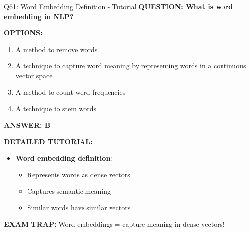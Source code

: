 \documentclass[8pt]{beamer}
\begin{document}
	\begin{frame}{Q61: Word Embedding Definition - Tutorial}
		\fontsize{6.5}{7.5}\selectfont
		\textbf{QUESTION: What is word embedding in NLP?}
		
		\vspace{0.1cm}
		\textbf{OPTIONS:}
		\begin{enumerate}
			\item A method to remove words
			\item A technique to capture word meaning by representing words in a continuous vector space
			\item A method to count word frequencies
			\item A technique to stem words
		\end{enumerate}
		
		\vspace{0.1cm}
		\textcolor{myblue}{\textbf{ANSWER: B}}
		
		\vspace{0.1cm}
		\textbf{DETAILED TUTORIAL:}
		\begin{itemize}
			\item \textbf{Word embedding definition:}
			\begin{itemize}
				\item Represents words as dense vectors
				\item Captures semantic meaning
				\item Similar words have similar vectors
			\end{itemize}
		\end{itemize}
		
		\textcolor{myred}{\textbf{EXAM TRAP:}} Word embeddings = \textcolor{myblue}{capture meaning in dense vectors}!
	\end{frame}
	
\end{document}
